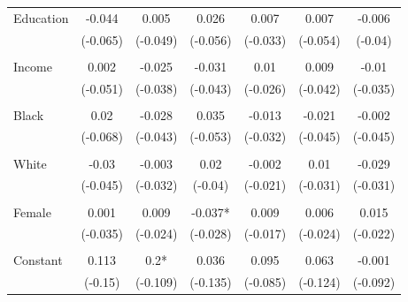 \documentclass[12pt]{article}
\begin{document}
\begin{appendices}
\begin{refsection}
\begin{table}[!ht]
\begin{adjustbox}{width=\textwidth,center}
\begin{tabular}{@{\extracolsep{5pt}}lcccccc}
Education            & -0.044             & 0.005    & 0.026     & 0.007             & 0.007    & -0.006        \\
                     & (-0.065)           & (-0.049) & (-0.056)  & (-0.033)          & (-0.054) & (-0.04)       \\
                     &                    &          &           &                   &          &               \\
Income               & 0.002              & -0.025   & -0.031    & 0.01              & 0.009    & -0.01         \\
                     & (-0.051)           & (-0.038) & (-0.043)  & (-0.026)          & (-0.042) & (-0.035)      \\
                     &                    &          &           &                   &          &               \\
Black                & 0.02               & -0.028   & 0.035     & -0.013            & -0.021   & -0.002        \\
                     & (-0.068)           & (-0.043) & (-0.053)  & (-0.032)          & (-0.045) & (-0.045)      \\
                     &                    &          &           &                   &          &               \\
White                & -0.03              & -0.003   & 0.02      & -0.002            & 0.01     & -0.029        \\
                     & (-0.045)           & (-0.032) & (-0.04)   & (-0.021)          & (-0.031) & (-0.031)      \\
                     &                    &          &           &                   &          &               \\
Female               & 0.001              & 0.009    & -0.037*   & 0.009             & 0.006    & 0.015         \\
                     & (-0.035)           & (-0.024) & (-0.028)  & (-0.017)          & (-0.024) & (-0.022)      \\
                     &                    &          &           &                   &          &               \\
Constant             & 0.113              & 0.2*     & 0.036     & 0.095             & 0.063    & -0.001        \\
                     & (-0.15)            & (-0.109) & (-0.135)  & (-0.085)          & (-0.124) & (-0.092)      \\ \hline

\end{tabular}
\end{adjustbox}
\end{table}
\end{refsection}
\end{appendices}
\end{document}
